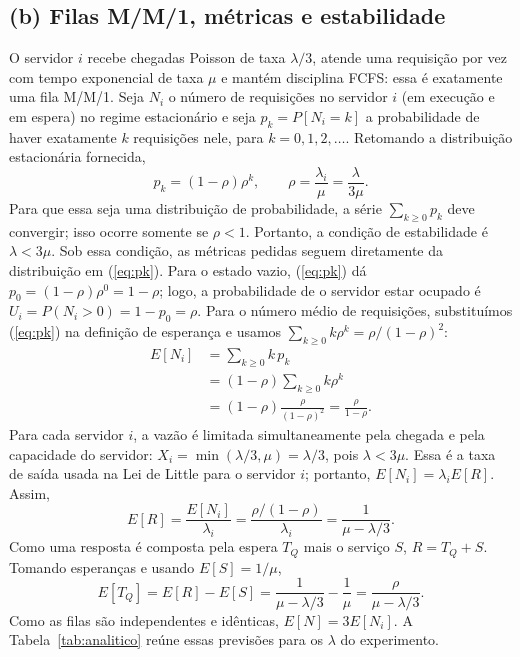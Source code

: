 \documentclass[conference,a4paper]{IEEEtran}
\begin{document}
\subsection{(b) Filas M/M/1, métricas e estabilidade}

O servidor $i$ recebe chegadas Poisson de taxa $\lambda/3$, atende uma
requisição por vez com tempo exponencial de taxa $\mu$ e mantém disciplina
FCFS: essa é exatamente uma fila M/M/1. Seja $N_i$ o número de
requisições no servidor $i$ (em execução e em espera) no regime estacionário
e seja $p_k=P[N_i=k]$ a probabilidade de haver exatamente $k$ requisições
nele, para $k=0,1,2,\dots$. Retomando a distribuição estacionária fornecida,
\begin{equation}
 p_k=(1-\rho)\rho^k,\qquad
 \rho=\frac{\lambda_i}{\mu}=\frac{\lambda}{3\mu}.
 \label{eq:pk}
\end{equation}
Para que essa seja uma distribuição de probabilidade, a série
$\sum_{k\ge0}p_k$ deve convergir; isso ocorre somente se $\rho<1$. Portanto,
a condição de estabilidade é $\lambda<3\mu$. Sob essa condição, as métricas
pedidas seguem diretamente da distribuição em (\ref{eq:pk}). Para o estado
vazio, (\ref{eq:pk}) dá $p_0=(1-\rho)\rho^0=1-\rho$; logo, a probabilidade
de o servidor estar ocupado é $U_i=P(N_i>0)=1-p_0=\rho$. Para o número médio de requisições, substituímos (\ref{eq:pk}) na definição
de esperança e usamos $\sum_{k\ge0}k\rho^k=\rho/(1-\rho)^2$:
\begin{align}
 E[N_i]
 &=\sum_{k\ge0}k\,p_k \\[-1mm]
 &= (1-\rho)\sum_{k\ge0}k\rho^k \\[-1mm]
 &= (1-\rho)\frac{\rho}{(1-\rho)^2}
  =\frac{\rho}{1-\rho}.
 \label{eq:eni}
\end{align}
Para cada servidor $i$, a vazão é limitada simultaneamente pela chegada e pela capacidade
do servidor: $X_i=\min(\lambda/3,\mu)=\lambda/3$, pois $\lambda<3\mu$. Essa é a taxa de saída
usada na Lei de Little para o servidor $i$; portanto,
$E[N_i]=\lambda_iE[R]$. Assim,
\begin{equation}
 E[R]=\frac{E[N_i]}{\lambda_i}
 =\frac{\rho/(1-\rho)}{\lambda_i}
 =\frac{1}{\mu-\lambda/3}.
 \label{eq:er}
\end{equation}
Como uma resposta é composta pela espera $T_Q$ mais o serviço $S$,
$R=T_Q+S$. Tomando esperanças e usando $E[S]=1/\mu$,
\begin{equation}
 E[T_Q]=E[R]-E[S]
 =\frac{1}{\mu-\lambda/3}-\frac{1}{\mu}
 =\frac{\rho}{\mu-\lambda/3}.
 \label{eq:etq}
\end{equation}
Como as filas são independentes e idênticas, $E[N]=3E[N_i]$. A
Tabela~\ref{tab:analitico} reúne essas previsões para os $\lambda$ do
experimento.
\end{document}
